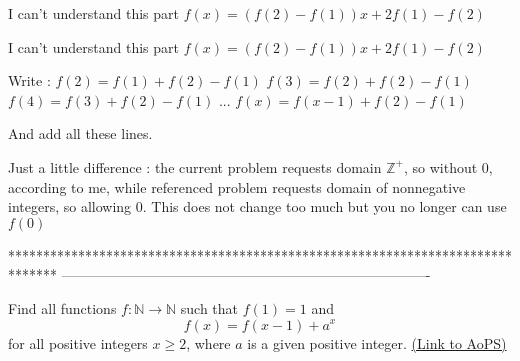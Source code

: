 \begin{solution}
	I can't understand this part $ f(x)=(f(2)-f(1))x+2f(1)-f(2) $
\end{solution}



\begin{solution}
	\begin{tcolorbox}I can't understand this part $ f(x)=(f(2)-f(1))x+2f(1)-f(2) $\end{tcolorbox}
Write :
$f(2)=f(1)+f(2)-f(1)$
$f(3)=f(2)+f(2)-f(1)$
$f(4)=f(3)+f(2)-f(1)$
...
$f(x)=f(x-1)+f(2)-f(1)$

And add all these lines.
\end{solution}






\begin{solution}
	\begin{tcolorbox}[url=http://www.usamts.org\/Solutions\/Solutions_20_4.pdf]2009 USAMTS #4[\/url]\end{tcolorbox}
Just a little difference : the current problem requests domain $\mathbb Z^+$, so without $0$, according to me, while referenced problem requests domain of nonnegative integers, so allowing $0$. This does not change too much but you no longer can use $f(0)$
\end{solution}
*******************************************************************************
-------------------------------------------------------------------------------

\begin{problem}
	Find all functions $ f:\mathbb{N}\rightarrow\mathbb{N} $ such that $f(1)=1$ and \[ f(x)=f(x-1)+a^x\] for all positive integers $x \geq 2$, where $a$ is a given positive integer.
	\flushright \href{https://artofproblemsolving.com/community/c6h406128}{(Link to AoPS)}
\end{problem}



